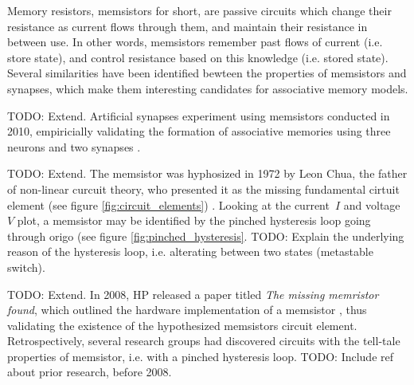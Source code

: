 \documentclass[12pt, a4paper]{article}
\begin{document}

Memory resistors, memsistors for short, are passive circuits which change their resistance as current flows through them, and maintain their resistance in between use. In other words, memsistors remember past flows of current (i.e. store state), and control resistance based on this knowledge (i.e. stored state). Several similarities have been identified bewteen the properties of memsistors and synapses, which make them interesting candidates for associative memory models.

TODO: Extend. Artificial synapses experiment using memsistors conducted in 2010, empiricially validating the formation of associative memories using three neurons and two synapses \cite{memristor_conditioning}.

TODO: Extend. The memsistor was hyphosized in 1972 by Leon Chua, the father of non-linear curcuit theory, who presented it as the missing fundamental cirtuit element (see figure \ref{fig:circuit_elements}) \cite{chua_memristor}. Looking at the current~$I$ and voltage~$V$ plot, a memsistor may be identified by the pinched hysteresis loop going through origo (see figure \ref{fig:pinched_hysteresis}. TODO: Explain the underlying reason of the hysteresis loop, i.e. alterating between two states (metastable switch).



TODO: Extend. In 2008, HP released a paper titled \textit{The missing memristor found}, which outlined the hardware implementation of a memsistor \cite{hp_memristor_found}, thus validating the existence of the hypothesized memsistors circuit element. Retrospectively, several research groups had discovered circuits with the tell-tale properties of memsistor, i.e. with a pinched hysteresis loop. TODO: Include ref about prior research, before 2008.
\end{document}
